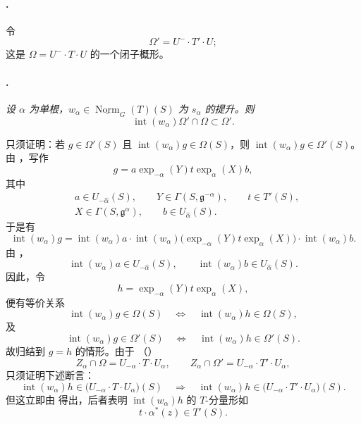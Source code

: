 \paragraph{.}
令
\[
  \Omega'=U^-\cdot T'\cdot U;
\]
这是 \(\Omega=U^-\cdot T\cdot U\) 的一个闭子概形。

\paragraph{.}
{\itshape 设 \(\alpha\) 为单根，\(w_\alpha\in\underline{\operatorname{Norm}}_G(T)(S)\) 为 \(s_\alpha\) 的提升。则
\[
  \operatorname{int}(w_\alpha)\Omega'\cap\Omega\subset\Omega'.
\]}

只须证明：若 \(g\in\Omega'(S)\) 且 \(\operatorname{int}(w_\alpha)g\in\Omega(S)\)，则 \(\operatorname{int}(w_\alpha)g\in\Omega'(S)\)。由 ，写作
\[
  g=a\exp_{-\alpha}(Y)t\exp_\alpha(X)b,
\]
其中
\[
 \begin{aligned}
 &a\in U_{-\widehat\alpha}(S),\qquad
  Y\in\Gamma(S,\mathfrak g^{-\alpha}),\qquad
  t\in T'(S),\\
 &X\in\Gamma(S,\mathfrak g^\alpha),\qquad
  b\in U_{\widehat\alpha}(S).
 \end{aligned}
\]
于是有
\[
  \operatorname{int}(w_\alpha)g
  =\operatorname{int}(w_\alpha)a\cdot
   \operatorname{int}(w_\alpha)
   \bigl(\exp_{-\alpha}(Y)t\exp_\alpha(X)\bigr)\cdot
   \operatorname{int}(w_\alpha)b.
\]
由 \textup{}，
\[
  \operatorname{int}(w_\alpha)a\in U_{-\widehat\alpha}(S),
  \qquad
  \operatorname{int}(w_\alpha)b\in U_{\widehat\alpha}(S).
\]
因此，令
\[
  h=\exp_{-\alpha}(Y)t\exp_\alpha(X),
\]
便有等价关系
\[
  \operatorname{int}(w_\alpha)g\in\Omega(S)
  \quad\Longleftrightarrow\quad
  \operatorname{int}(w_\alpha)h\in\Omega(S),
\]
及
\[
  \operatorname{int}(w_\alpha)g\in\Omega'(S)
  \quad\Longleftrightarrow\quad
  \operatorname{int}(w_\alpha)h\in\Omega'(S).
\]
故归结到 \(g=h\) 的情形。由于 \textup{（）}
\[
  Z_\alpha\cap\Omega
  =U_{-\alpha}\cdot T\cdot U_\alpha,
  \qquad
  Z_\alpha\cap\Omega'
  =U_{-\alpha}\cdot T'\cdot U_\alpha,
\]
只须证明下述断言：
\[
  \operatorname{int}(w_\alpha)h
  \in\bigl(U_{-\alpha}\cdot T\cdot U_\alpha\bigr)(S)
  \quad\Longrightarrow\quad
  \operatorname{int}(w_\alpha)h
  \in\bigl(U_{-\alpha}\cdot T'\cdot U_\alpha\bigr)(S).
\]
但这立即由  得出，后者表明 \(\operatorname{int}(w_\alpha)h\) 的 \(T\)-分量形如
\[
  t\cdot\alpha^*(z)\in T'(S).
\]

